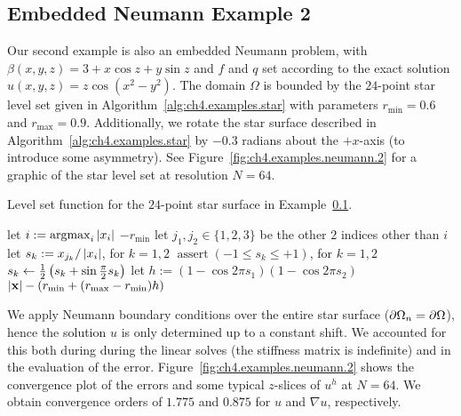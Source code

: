 \subsection{Embedded Neumann Example 2} \label{subsec:ch4.examples.neumann.2}

Our second example is also an embedded Neumann problem, with $\beta(x,y,z) = 3 + x \cos z + y \sin z$ and $f$ and $q$ set according to the exact solution $u(x,y,z) = z \cos \left( x^2 - y^2 \right)$. The domain $\Omega$ is bounded by the $24$-point star level set given in Algorithm~\ref{alg:ch4.examples.star} with parameters $r_{\text{min}} = 0.6$ and $r_{\text{max}} = 0.9$. Additionally, we rotate the star surface described in Algorithm~\ref{alg:ch4.examples.star} by $-0.3$ radians about the $+x$-axis (to introduce some asymmetry). See Figure~\ref{fig:ch4.examples.neumann.2} for a graphic of the star level set at resolution $N = 64$.

\begin{algorithm}[htbp]
\caption{Level set function for the $24$-point star surface in Example~\ref{subsec:ch4.examples.neumann.2}.}
\label{alg:ch4.examples.star}
\begin{algorithmic}[1]
\STATE {}
\STATE {}
\STATE let $i := \operatorname{argmax}_i \left\lvert x_i \right\rvert$
    \RETURN $-r_{\text{min}}$
\ENDIF
\STATE let $j_1, j_2 \in \{1, 2, 3\}$ be the other $2$ indices other than $i$
\STATE let $s_k := x_{j_k} / \left\lvert x_i \right\rvert$, for $k = 1,2$
\STATE {}
\STATE $\operatorname{assert}(-1 \leq s_k \leq +1)$, for $k = 1,2$
\STATE $s_k \leftarrow \frac{1}{2} \left( s_k + \sin \frac{\pi}{2} s_k \right)$ 
\STATE let $h := (1 - \cos 2 \pi s_1) (1 - \cos 2\pi s_2)$
\RETURN $\left\lvert \mathbf{x} \right\rvert - (r_{\text{min}} + (r_{\text{max}} - r_{\text{min}}) h)$
\end{algorithmic}
\end{algorithm}

We apply Neumann boundary conditions over the entire star surface ($\partial\Omega_n = \partial\Omega$), hence the solution $u$ is only determined up to a constant shift. We accounted for this both during during the linear solves (the stiffness matrix is indefinite) and in the evaluation of the error. Figure~\ref{fig:ch4.examples.neumann.2} shows the convergence plot of the errors and some typical $z$-slices of $u^h$ at $N = 64$. We obtain convergence orders of $1.775$ and $0.875$ for $u$ and $\nabla u$, respectively.

